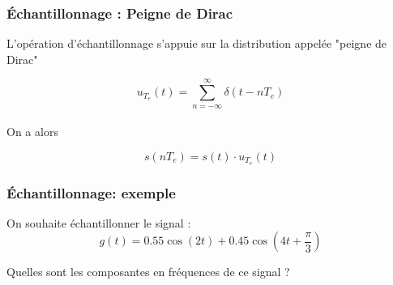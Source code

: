 \documentclass{beamer}
\begin{document}
\begin{frame}
\frametitle{\'Echantillonnage : Peigne de Dirac}

L'opération d'échantillonnage s'appuie sur la distribution appelée "peigne de Dirac"\\

\vspace{0.7cm} 

 \[ u_{T_e}(t) = \sum_{n = -\infty}^{\infty} \delta(t-nT_e) \]\\
 
\vspace{0.7cm}
On a alors\\

\vspace{0.3cm}

 \[\boxed{s(nT_e) = s(t) \cdot u_{T_e}(t)}\]


\end{frame} 
\begin{frame}
\frametitle{\'Echantillonnage: exemple}
On souhaite échantillonner le signal : $$ g(t) = 0.55\cos(2 t) + 0.45 \cos(4 t + \frac{\pi}{3}) $$ 

{
\begin{block}{}
Quelles sont les composantes en fréquences de ce signal ?
\end{block}
}
\end{frame}
\end{document}
